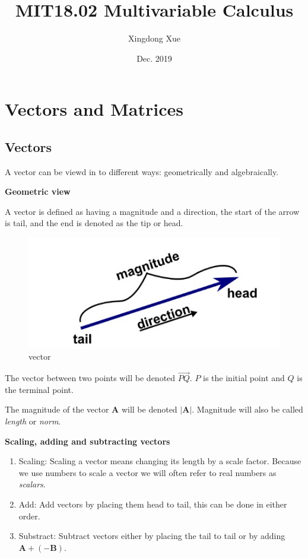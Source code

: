 \documentclass{article}
\title{MIT18.02 Multivariable Calculus}
\author{Xingdong Xue}
\date{Dec. 2019}
\begin{document}
\maketitle

\section{Vectors and Matrices}
\subsection{Vectors}
A vector can be viewd in to different ways: geometrically and algebraically.

\textbf{Geometric view}

A vector is defined as having a magnitude and a direction, the start of the arrow is tail, and the end is denoted as the tip or head.
\begin{figure}[h]
  \centering
  \includegraphics[width=.8\textwidth]{vector.jpg}
  \caption{vector}
  \label{vector}
\end{figure}

The vector between two points will be denoted $\overrightarrow{PQ}$. $P$ is the initial point and $Q$ is the terminal point.

The magnitude of the vector \textbf{A} will be denoted $\mathbf{\left| A \right|}$. Magnitude will also be called \textit{length} or \textit{norm}.

\textbf{Scaling, adding and subtracting vectors}

\begin{enumerate}
  \item Scaling: Scaling a vector means changing its length by a scale factor. Because we use numbers to scale a vector we will often refer to real numbers as \textit{scalars}.
  \item Add: Add vectors by placing them head to tail, this can be done in either order.
  \item Substract: Subtract vectors either by placing the tail to tail or by adding $\mathbf{A+(-B)}$.
\end{enumerate}
\end{document}
